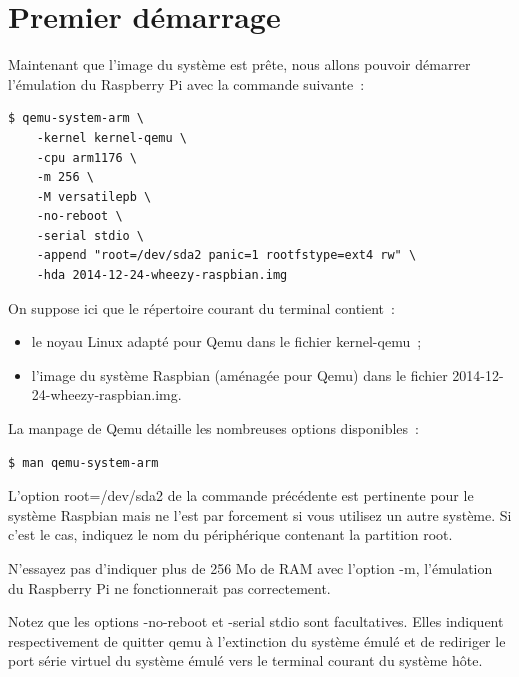 \documentclass{article}
\begin{document}

\section{Premier démarrage}\label{sec:first-boot}

Maintenant que l'image du système est prête, nous allons pouvoir démarrer l'émulation du Raspberry Pi avec la commande suivante~:
\begin{verbatim}
$ qemu-system-arm \
    -kernel kernel-qemu \
    -cpu arm1176 \
    -m 256 \
    -M versatilepb \
    -no-reboot \
    -serial stdio \
    -append "root=/dev/sda2 panic=1 rootfstype=ext4 rw" \
    -hda 2014-12-24-wheezy-raspbian.img
\end{verbatim}

On suppose ici que le répertoire courant du terminal contient~:
\begin{itemize}
    \item le noyau Linux adapté pour Qemu dans le fichier \og{}kernel-qemu\fg{}~;
    \item l'image du système Raspbian (aménagée pour Qemu) dans le fichier \og{}2014-12-24-wheezy-raspbian.img\fg{}.
\end{itemize}

La manpage de Qemu détaille les nombreuses options disponibles~:
\begin{verbatim}
$ man qemu-system-arm
\end{verbatim}

L'option \og{}root=/dev/sda2\fg{} de la commande précédente est pertinente pour
le système Raspbian mais ne l'est par forcement si vous utilisez un autre
système. Si c'est le cas, indiquez le nom du périphérique contenant la
partition root.

N'essayez pas d'indiquer plus de 256 Mo de RAM avec l'option \og{}-m\fg{}, l'émulation
du Raspberry Pi ne fonctionnerait pas correctement.

Notez que les options \og{}-no-reboot\fg{} et \og{}-serial stdio\fg{} sont facultatives.
Elles indiquent respectivement de quitter qemu à l'extinction du système émulé et
de rediriger le port série virtuel du système émulé vers le terminal courant du
système hôte.
\end{document}
